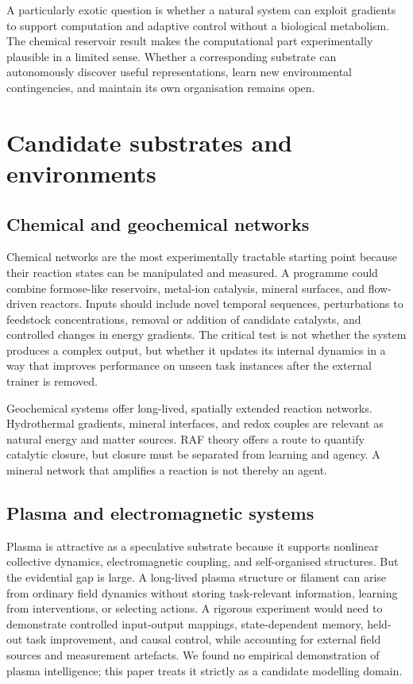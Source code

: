 \documentclass[11pt]{article}
\begin{document}
A particularly exotic question is whether a natural system can exploit gradients to support computation and adaptive control without a biological metabolism. The chemical reservoir result makes the computational part experimentally plausible in a limited sense. Whether a corresponding substrate can autonomously discover useful representations, learn new environmental contingencies, and maintain its own organisation remains open.

\section{Candidate substrates and environments}

\subsection{Chemical and geochemical networks}

Chemical networks are the most experimentally tractable starting point because their reaction states can be manipulated and measured. A programme could combine formose-like reservoirs, metal-ion catalysis, mineral surfaces, and flow-driven reactors. Inputs should include novel temporal sequences, perturbations to feedstock concentrations, removal or addition of candidate catalysts, and controlled changes in energy gradients. The critical test is not whether the system produces a complex output, but whether it updates its internal dynamics in a way that improves performance on unseen task instances after the external trainer is removed.

Geochemical systems offer long-lived, spatially extended reaction networks. Hydrothermal gradients, mineral interfaces, and redox couples are relevant as natural energy and matter sources. RAF theory offers a route to quantify catalytic closure, but closure must be separated from learning and agency. A mineral network that amplifies a reaction is not thereby an agent.

\subsection{Plasma and electromagnetic systems}

Plasma is attractive as a speculative substrate because it supports nonlinear collective dynamics, electromagnetic coupling, and self-organised structures. But the evidential gap is large. A long-lived plasma structure or filament can arise from ordinary field dynamics without storing task-relevant information, learning from interventions, or selecting actions. A rigorous experiment would need to demonstrate controlled input-output mappings, state-dependent memory, held-out task improvement, and causal control, while accounting for external field sources and measurement artefacts. We found no empirical demonstration of plasma intelligence; this paper treats it strictly as a candidate modelling domain.
\end{document}

